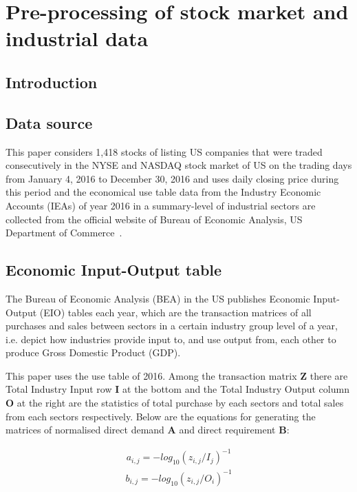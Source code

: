 \chapter[Pre-processing of data]{Pre-processing of stock market and industrial data}
\section{Introduction}
\section{Data source}
This paper considers 1,418 stocks of listing US companies that were traded consecutively in the NYSE and NASDAQ stock market of US on the trading days from January 4, 2016 to December 30, 2016 and uses daily closing price during this period and the economical use table data from the Industry Economic Accounts (IEAs) of year 2016 in a summary-level of industrial sectors are collected from the official website of Bureau of Economic Analysis, US Department of Commerce~\cite{bea}.

\section{Economic Input-Output table}
The Bureau of Economic Analysis (BEA) in the US publishes Economic Input-Output (EIO) tables each year, which are the transaction matrices of all purchases and sales between sectors in a certain industry group level of a year, i.e. depict how industries provide input to, and use output from, each other to produce Gross Domestic Product (GDP).

This paper uses the use table of 2016. Among the transaction matrix \textbf{Z} there are Total Industry Input row \textbf{I} at the bottom and the Total Industry Output column \textbf{O} at the right are the statistics of total purchase by each sectors and total sales from each sectors respectively. Below are the equations for generating the matrices of normalised direct demand \textbf{A} and direct requirement \textbf{B}:

\begin{eqnarray}\label{equ:eio_i}
a_{i,j} = -log_{10}(z_{i,j} / I_j)^{-1}
\end{eqnarray}
\begin{eqnarray}\label{equ:eio_o}
b_{i,j} = -log_{10}(z_{i,j} / O_i)^{-1}
\end{eqnarray}

